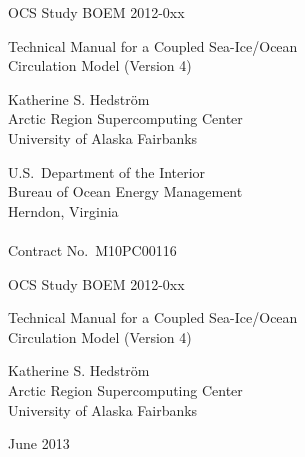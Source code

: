 %
%



\pagestyle{empty}
\centerline{\hfill OCS Study BOEM 2012-0xx}

\vspace {2 cm}
\begin{center}
  {\LARGE Technical Manual for a Coupled Sea-Ice/Ocean \\ Circulation
   Model (Version 4)  }
\end{center}
\vspace {2 cm}
\begin{center}
  Katherine S. Hedstr\"{o}m \\ Arctic Region Supercomputing Center
  \\ University of Alaska Fairbanks
\end{center}
\vspace {2 cm}
\begin{center}
  U.S.\ Department of the Interior \\ Bureau of Ocean Energy
  Management \\
  Herndon, Virginia \\ \mbox{} \\ Contract No.\ M10PC00116
\end{center}
\newpage
\centerline{\hfill OCS Study BOEM 2012-0xx}
\vspace {2 cm}
\begin{center}
  {\LARGE Technical Manual for a Coupled Sea-Ice/Ocean \\ Circulation
   Model (Version 4)  }
\end{center}
\vspace {2 cm}
\begin{center}
  Katherine S. Hedstr\"{o}m \\ Arctic Region Supercomputing Center
  \\ University of Alaska Fairbanks
\end{center}
\vspace {2 cm}
\centerline{June 2013}
\vfill


